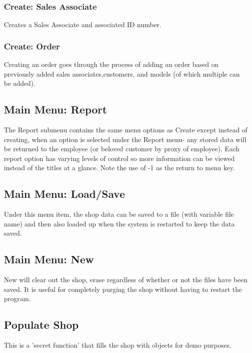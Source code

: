 \documentclass{article}
\begin{document}
\subsubsection{Create: Sales Associate}
Creates a Sales Associate and associated ID number.
\subsubsection{Create: Order}
Creating an order goes through the process of adding an order based on previously added sales associates,customers, and models (of which multiple can be added).

\subsection{Main Menu: Report}
The Report submenu contains the same menu options as Create except instead of creating, when an option is selected under the Report menu- any stored data will be returned to the employee (or beloved customer by proxy of employee). Each report option has varying levels of control so more information can be viewed instead of the titles at a glance. Note the use of -1 as the return to menu key.
\subsection{Main Menu: Load/Save}
Under this menu item, the shop data can be saved to a file (with variable file name) and then also loaded up when the system is restarted to keep the data saved. 
\subsection{Main Menu: New}
New will clear out the shop, erase regardless of whether or not the files have been saved. It is useful for completely purging the shop without having to restart the program.

\subsection{Populate Shop}
This is a 'secret function' that fills the shop with objects for demo purposes.
\end{document}
